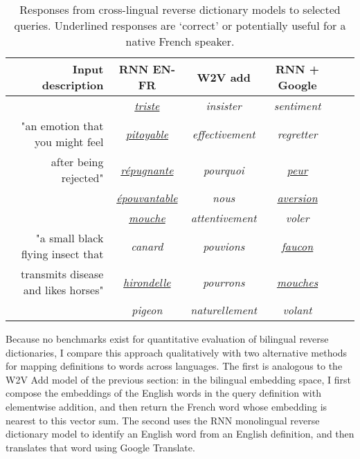 \begin{table*}[ht]
{\small
\emph
\hfill{}
\begin{tabular}{r|ccccc|}
\bf Input description & \bf RNN EN-FR & \bf W2V add &  \bf RNN + Google  \\
\hline
\rule{0pt}{3ex} 
& \emph{ \underline{triste}} & \emph {insister} & \emph{ sentiment} \\
  "an emotion that you might feel &  \emph{ \underline{pitoyable}} & \emph {effectivement} & \emph{regretter} \\

after being rejected" & \emph{ \underline{r\'epugnante}} & \emph{pourquoi} &\emph{  \underline{peur} } \\
 & \emph{\underline{\'epouvantable}} & \emph{nous} &\emph{  \underline{aversion} } \\
\rule{0pt}{5ex} 
 & \emph{\underline{mouche}} & \emph {attentivement} & \emph{ voler} \\ 
"a small black flying insect that  & \emph{canard} & \emph {pouvions} & \emph{\underline{faucon}} \\ 
transmits disease and likes horses" &  \emph{\underline{hirondelle}} & \emph{pourrons} & \emph{\underline{mouches}} \\
&  \emph{pigeon} & \emph{naturellement} & \emph{volant} \\
\end{tabular}}
\hfill{}
\caption{Responses from cross-lingual reverse dictionary models to selected queries. Underlined responses are `correct' or potentially useful for a native French speaker.}
\label{cross}
\end{table*}

Because no benchmarks exist for quantitative evaluation of bilingual reverse dictionaries, I compare this approach qualitatively with two alternative methods for mapping definitions to words across languages. The first is analogous to the W2V Add model of the previous section: in the bilingual embedding space, I first compose the embeddings of the English words in the query definition with elementwise addition, and then return the French word whose embedding is nearest to this vector sum. The second uses the RNN monolingual reverse dictionary model to identify an English word from an English definition, and then translates that word using Google Translate.

